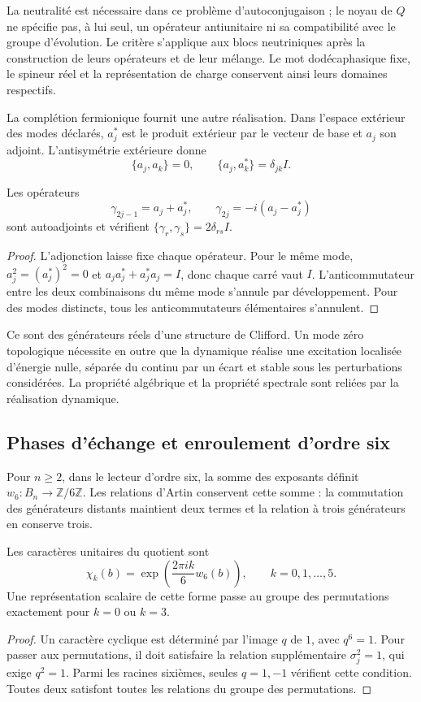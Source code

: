 La neutralité est nécessaire dans ce problème d’autoconjugaison ;
le noyau de $Q$ ne spécifie pas, à lui seul, un opérateur antiunitaire
ni sa compatibilité avec le groupe d’évolution. Le critère s’applique aux
blocs neutriniques après la construction de leurs opérateurs et de leur mélange.
Le mot dodécaphasique fixe, le spineur réel et la représentation de
charge conservent ainsi leurs domaines respectifs.

La complétion fermionique fournit une autre réalisation. Dans
l’espace extérieur des modes déclarés, $a_j^*$ est le produit
extérieur par le vecteur de base et $a_j$ son adjoint. L’antisymétrie
extérieure donne
\[
 \{a_j,a_k\}=0,\qquad \{a_j,a_k^*\}=\delta_{jk}I.
\]

\begin{proposition}
\label{vi:prop:car-real}
Les opérateurs
\[
 \gamma_{2j-1}=a_j+a_j^*,\qquad
 \gamma_{2j}=-i(a_j-a_j^*)
\]
sont autoadjoints et vérifient $\{\gamma_r,\gamma_s\}=2\delta_{rs}I$.
\end{proposition}
\begin{proof}
L’adjonction laisse fixe chaque opérateur. Pour le même mode,
$a_j^2=(a_j^*)^2=0$ et $a_ja_j^*+a_j^*a_j=I$, donc chaque
carré vaut $I$. L’anticommutateur entre les deux combinaisons
du même mode s’annule par développement. Pour des modes distincts,
tous les anticommutateurs élémentaires s’annulent.
\end{proof}

Ce sont des générateurs réels d’une structure de Clifford. Un mode
zéro topologique nécessite en outre que la dynamique réalise une excitation
localisée d’énergie nulle, séparée du continu par un écart et
stable sous les perturbations considérées. La propriété algébrique
et la propriété spectrale sont reliées par la réalisation dynamique.

\subsection{Phases d’échange et enroulement d’ordre six}

Pour \(n\ge2\), dans le lecteur d’ordre six, la somme des exposants définit
$w_6:B_n\to\mathbb Z/6\mathbb Z$. Les relations d’Artin
conservent cette somme : la commutation des générateurs distants maintient
deux termes et la relation à trois générateurs en conserve trois.

\begin{proposition}
\label{vi:prop:devanado-seis}
Les caractères unitaires du quotient sont
\[
 \chi_k(b)=\exp\!\left(\frac{2\pi i k}{6}w_6(b)\right),
 \qquad k=0,1,\ldots,5.
\]
Une représentation scalaire de cette forme passe au groupe des
permutations exactement pour $k=0$ ou $k=3$.
\end{proposition}
\begin{proof}
Un caractère cyclique est déterminé par l’image $q$ de $1$,
avec $q^6=1$. Pour passer aux permutations, il doit satisfaire la
relation supplémentaire $\sigma_j^2=1$, qui exige $q^2=1$.
Parmi les racines sixièmes, seules $q=1,-1$ vérifient cette condition.
Toutes deux satisfont toutes les relations du groupe des permutations.
\end{proof}


